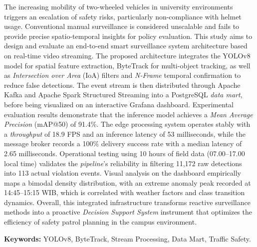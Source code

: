 \begin{abstracteng}
  \justifying
  The increasing mobility of two-wheeled vehicles in university environments triggers an escalation of safety risks, particularly non-compliance with helmet usage. Conventional manual surveillance is considered unscalable and fails to provide precise spatio-temporal insights for policy evaluation. This study aims to design and evaluate an end-to-end smart surveillance system architecture based on real-time video streaming. The proposed architecture integrates the YOLOv8 model for spatial feature extraction, ByteTrack for multi-object tracking, as well as \textit{Intersection over Area} (IoA) filters and \textit{N-Frame} temporal confirmation to reduce false detections. The event stream is then distributed through Apache Kafka and Apache Spark Structured Streaming into a PostgreSQL \textit{data mart}, before being visualized on an interactive Grafana dashboard. Experimental evaluation results demonstrate that the inference model achieves a \textit{Mean Average Precision} (mAP@50) of 91.4\%. The edge processing system operates stably with a \textit{throughput} of 18.9 FPS and an inference latency of 53 milliseconds, while the message broker records a 100\% delivery success rate with a median latency of 2.65 milliseconds. Operational testing using 10 hours of field data (07.00--17.00 local time) validates the \textit{pipeline}'s reliability in filtering 11,172 raw detections into 113 actual violation events. Visual analysis on the dashboard empirically maps a bimodal density distribution, with an extreme anomaly peak recorded at 14:45--15:15 WIB, which is correlated with weather factors and class transition dynamics. Overall, this integrated infrastructure transforms reactive surveillance methods into a proactive \textit{Decision Support System} instrument that optimizes the efficiency of safety patrol planning in the campus environment.

  \bigskip
  \noindent
  \textbf{Keywords:} YOLOv8, ByteTrack, Stream Processing, Data Mart, Traffic Safety.
\end{abstracteng}
